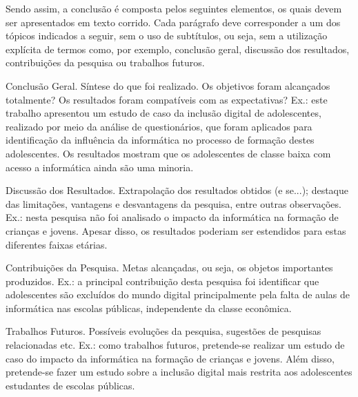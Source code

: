 Sendo assim, a conclusão é composta pelos seguintes elementos, os quais devem ser apresentados em texto corrido. Cada parágrafo deve corresponder a um dos tópicos indicados a seguir, sem o uso de subtítulos, ou seja, sem a utilização explícita de termos como, por exemplo, conclusão geral, discussão dos resultados, contribuições da pesquisa ou trabalhos futuros.

	Conclusão Geral. Síntese do que foi realizado. Os objetivos foram alcançados totalmente? Os resultados foram compatíveis com as expectativas?
	Ex.: este trabalho apresentou um estudo de caso da inclusão digital de adolescentes, realizado por meio da análise de questionários, que foram aplicados para identificação da influência da informática no processo de formação destes adolescentes. Os resultados mostram que os adolescentes de classe baixa com acesso a informática ainda são uma minoria.
	
 Discussão dos Resultados. Extrapolação dos resultados obtidos (e se...); destaque das limitações, vantagens e desvantagens da pesquisa, entre outras observações.
	Ex.: nesta pesquisa não foi analisado o impacto da informática na formação de crianças e jovens. Apesar disso, os resultados poderiam ser estendidos para estas diferentes faixas etárias.
	
 Contribuições da Pesquisa. Metas alcançadas, ou seja, os objetos importantes produzidos.
	Ex.: a principal contribuição desta pesquisa foi identificar que adolescentes são excluídos do mundo digital principalmente pela falta de aulas de informática nas escolas públicas, independente da classe econômica.
	
 Trabalhos Futuros. Possíveis evoluções da pesquisa, sugestões de pesquisas relacionadas etc.
	Ex.: como trabalhos futuros, pretende-se realizar um estudo de caso do impacto da informática na formação de crianças e jovens. Além disso, pretende-se fazer um estudo sobre a inclusão digital mais restrita aos adolescentes estudantes de escolas públicas.
\fi
